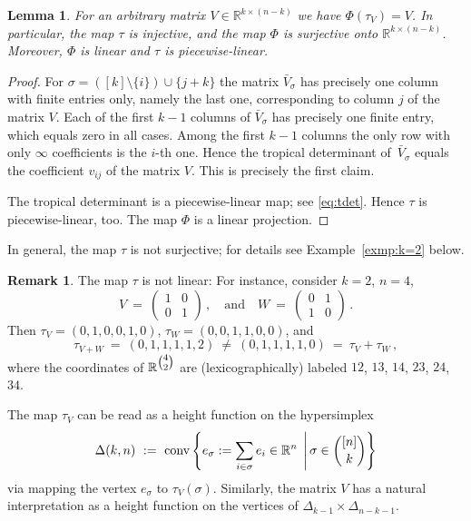 \documentclass[11pt,a4paper]{amsart}
\newcommand{\RR}{{\mathbb{R}}}
\newcommand{\SetOf}[2]{\left\{#1\vphantom{#2}\,\right.\left|\,\vphantom{#1}#2\right\}}
\DeclareMathOperator{\conv}{conv}
\newcommand{\Hypersimplex}[2]{{\Delta(#1,#2)}}
\theoremstyle{plain}
\newtheorem{lemma}[theorem]{Lemma}
\theoremstyle{definition}
\newtheorem{remark}[theorem]{Remark}
\begin{document}
\begin{lemma}\label{lem:Phi-tau}
  For an arbitrary matrix $V\in\RR^{k\times (n-k)}$ we have $\Phi(\tau_V) = V$.  In particular, the
  map $\tau$ is injective, and the map $\Phi$ is surjective onto $\RR^{k\times (n-k)}$.  Moreover, $\Phi$ is linear and $\tau$ is piecewise-linear.
\end{lemma}

\begin{proof}
  For $\sigma=([k]\setminus\{i\})\cup\{j+k\}$ the matrix $\bar V_\sigma$ has precisely one column
  with finite entries only, namely the last one, corresponding to column $j$ of the matrix $V$.
  Each of the first $k-1$ columns of $\bar V_\sigma$ has precisely one finite entry, which equals
  zero in all cases.  Among the first $k-1$ columns the only row with only $\infty$ coefficients is
  the $i$-th one.  Hence the tropical determinant of~$\bar V_\sigma$ equals the coefficient $v_{ij}$
  of the matrix $V$.  This is precisely the first claim.

  The tropical determinant is a piecewise-linear map; see \eqref{eq:tdet}.  Hence $\tau$ is piecewise-linear, too.  The map $\Phi$ is a linear projection.
\end{proof}

In general, the map $\tau$ is not surjective; for details see Example~\ref{exmp:k=2} below.

\begin{remark}
  The map $\tau$ is not linear: For instance, consider $k=2$, $n=4$,
  \[
  V \ = \ \begin{pmatrix} 1 & 0 \\ 0 & 1 \end{pmatrix} \, ,
  \quad \text{and} \quad
  W \ = \ \begin{pmatrix} 0 & 1 \\ 1 & 0 \end{pmatrix} \, .
  \]
  Then $\tau_V=(0,1,0,0,1,0)$, $\tau_W=(0,0,1,1,0,0)$, and
  \[
  \tau_{V+W} \ = \ (0,1,1,1,1,2) \ \ne \ (0,1,1,1,1,0) \ = \ \tau_V+\tau_W \, ,
  \]
  where the coordinates of $\RR^{\tbinom{4}{2}}$ are (lexicographically) labeled $12$, $13$, $14$,
  $23$, $24$, $34$.
\end{remark}

The map $\tau_V$ can be read as a height function on the hypersimplex
\[
\Hypersimplex{k}{n} \ := \ \conv\SetOf{e_\sigma:=\sum_{i\in \sigma} e_i\in \RR^n}{\sigma\in\binom{[n]}{k}}
\]
via mapping the vertex $e_\sigma$ to $\tau_V(\sigma)$.  Similarly, the matrix $V$ has a natural
interpretation as a height function on the vertices of $\Delta_{k-1}\times\Delta_{n-k-1}$.
\end{document}
